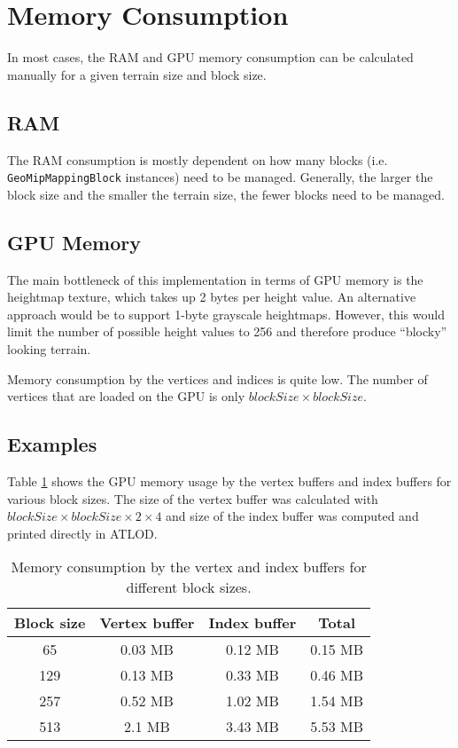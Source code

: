 \section{Memory Consumption}
In most cases, the RAM and GPU memory consumption can be calculated manually for a given
terrain size and block size.

\subsection{RAM}
The RAM consumption is mostly dependent on how many blocks (i.e. \\ \texttt{GeoMipMappingBlock} instances) need to be managed.
Generally, the larger the block size and the smaller the terrain size, the fewer blocks need to be managed.

\subsection{GPU Memory}
The main bottleneck of this implementation in terms of GPU memory is 
the heightmap texture, which takes up 2 bytes per height value.
An alternative approach would be to support 1-byte grayscale heightmaps. However, this would 
limit the number of possible height values to 256 and therefore produce
``blocky'' looking terrain.

Memory consumption by the vertices and indices is quite low.
The number of vertices that are loaded on the GPU is only $blockSize \times blockSize$.

\subsection{Examples}
Table \ref{tbl:memory-vbo-ebo} shows the GPU memory usage by the vertex buffers and index buffers for 
various block sizes. The size of the vertex buffer was calculated with $blockSize \times blockSize \times 2 \times 4$
and size of the index buffer was computed and printed directly in ATLOD.

\begin{table}[H]
  \begin{center}
    \begin{tabular}{ c|c|c|c }
      Block size & Vertex buffer & Index buffer & Total\\
      \hline
      65 & 0.03 MB & 0.12 MB & 0.15 MB\\
      \hline 
      129 & 0.13 MB & 0.33 MB & 0.46 MB\\
      \hline
      257 & 0.52 MB & 1.02 MB & 1.54 MB\\
      \hline
      513 & 2.1 MB & 3.43 MB & 5.53 MB
    \end{tabular}
  \end{center}
  \caption{Memory consumption by the vertex and index buffers for different block sizes.}\label{tbl:memory-vbo-ebo}
\end{table}

